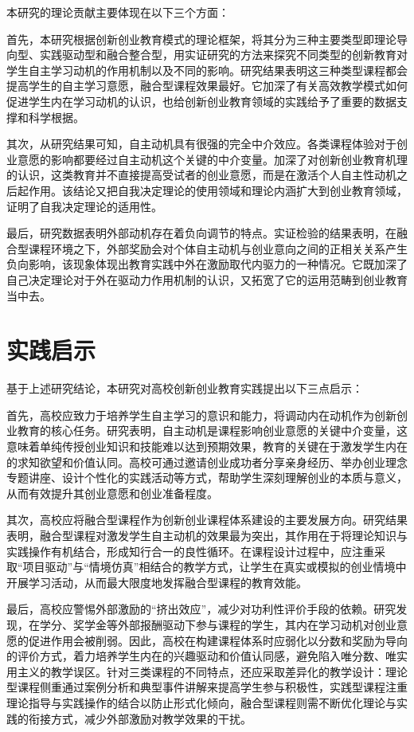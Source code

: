 本研究的理论贡献主要体现在以下三个方面：

首先，本研究根据创新创业教育模式的理论框架，将其分为三种主要类型即理论导向型、实践驱动型和融合整合型，用实证研究的方法来探究不同类型的创新教育对学生自主学习动机的作用机制以及不同的影响。研究结果表明这三种类型课程都会提高学生的自主学习意愿，融合型课程效果最好。它加深了有关高效教学模式如何促进学生内在学习动机的认识，也给创新创业教育领域的实践给予了重要的数据支撑和科学根据。

其次，从研究结果可知，自主动机具有很强的完全中介效应。各类课程体验对于创业意愿的影响都要经过自主动机这个关键的中介变量。加深了对创新创业教育机理的认识，这类教育并不直接提高受试者的创业意愿，而是在激活个人自主性动机之后起作用。该结论又把自我决定理论的使用领域和理论内涵扩大到创业教育领域，证明了自我决定理论的适用性。

最后，研究数据表明外部动机存在着负向调节的特点。实证检验的结果表明，在融合型课程环境之下，外部奖励会对个体自主动机与创业意向之间的正相关关系产生负向影响，该现象体现出教育实践中外在激励取代内驱力的一种情况。它既加深了自己决定理论对于外在驱动力作用机制的认识，又拓宽了它的运用范畴到创业教育当中去。

\section{实践启示}

基于上述研究结论，本研究对高校创新创业教育实践提出以下三点启示：

首先，高校应致力于培养学生自主学习的意识和能力，将调动内在动机作为创新创业教育的核心任务。研究表明，自主动机是课程影响创业意愿的关键中介变量，这意味着单纯传授创业知识和技能难以达到预期效果，教育的关键在于激发学生内在的求知欲望和价值认同。高校可通过邀请创业成功者分享亲身经历、举办创业理念专题讲座、设计个性化的实践活动等方式，帮助学生深刻理解创业的本质与意义，从而有效提升其创业意愿和创业准备程度。

其次，高校应将融合型课程作为创新创业课程体系建设的主要发展方向。研究结果表明，融合型课程对激发学生自主动机的效果最为突出，其作用在于将理论知识与实践操作有机结合，形成知行合一的良性循环。在课程设计过程中，应注重采取\nolinebreak[3]“项目驱动”与\nolinebreak[3]“情境仿真”相结合的教学方式，让学生在真实或模拟的创业情境中开展学习活动，从而最大限度地发挥融合型课程的教育效能。

最后，高校应警惕外部激励的\nolinebreak[3]“挤出效应”，减少对功利性评价手段的依赖。研究发现，在学分、奖学金等外部报酬驱动下参与课程的学生，其内在学习动机对创业意愿的促进作用会被削弱。因此，高校在构建课程体系时应弱化以分数和奖励为导向的评价方式，着力培养学生内在的兴趣驱动和价值认同感，避免陷入唯分数、唯实用主义的教学误区。针对三类课程的不同特点，还应采取差异化的教学设计：理论型课程侧重通过案例分析和典型事件讲解来提高学生参与积极性，实践型课程注重理论指导与实践操作的结合以防止形式化倾向，融合型课程则需不断优化理论与实践的衔接方式，减少外部激励对教学效果的干扰。

